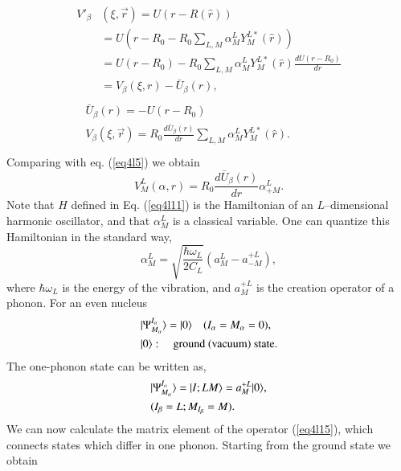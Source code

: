 \begin{subappendices}
\begin{align}\label{eq4l13}
\begin{split}
 V'_\beta & (\xi,\vec r)= U(r-R(\hat r))\\
& = U(r-R_0 -R_0\sum_{L,M} \alpha_M^L Y_M^{L*}(\hat r))\\
& = U(r-R_0) -R_0\sum_{L,M} \alpha_M^L Y_M^{L*}(\hat r) \frac{d U (r-R_0)}{d r}\\
& = V_\beta (\xi, r)- \bar{U}_\beta (r),
\end{split}\\\label{eq4l14}
\begin{split}
& \bar{U}_\beta (r)= -U(r-R_0)\\
& V_\beta (\xi,\vec r)=R_0 \frac{d \bar U_\beta (r)}{d r}\sum_{L,M} \alpha_M^L Y_M^{L*}(\hat r). \\
\end{split}
\end{align}
Comparing with eq. (\ref{eq4l5}) we obtain
\begin{equation}\label{eq4l15}
 V^L_M(\alpha,r)=R_0 \frac{d \bar U_\beta (r)}{d r} \alpha_{+M}^L.
\end{equation}
Note that $H$ defined in Eq. (\ref{eq4l11}) is the Hamiltonian of an $L$--dimensional harmonic oscillator, and that $\alpha_M^L$ is a classical variable. One can quantize this Hamiltonian in the standard way,
\begin{equation}\label{eq4l16}
\alpha_M^L=\sqrt{\frac{\hbar \omega_L}{2 C_L}}(a_M^L-a^{+L}_{-M}),
\end{equation}
where $\hbar \omega_L$  is the energy of the vibration, and $a^{+L}_{M}$ is the creation operator of a phonon. For an even nucleus
\begin{align}\label{eq4l17}
& \vert \Psi^{I_\alpha}_{M_\alpha}\rangle=\vert 0\rangle \quad (I_\alpha=M_\alpha=0),\\
& \vert 0\rangle:\quad \text{ground (vacuum) state}. \notag
\end{align}
The one-phonon state can be written as,
\begin{align}\label{eq4l18}
& \vert \Psi^{I_\alpha}_{M_\alpha}\rangle=\vert I;LM \rangle =a^{+L}_{M} \vert 0\rangle,\\
& (I_\beta=L;M_{I_\beta}=M). \notag
\end{align}
We can now calculate the matrix element of the operator (\ref{eq4l15}), which connects states which differ in one phonon. Starting from the ground state we obtain
\begin{equation}\label{eq4l19}
\begin{split}

\end{split}
\end{equation}
\end{subappendices}
